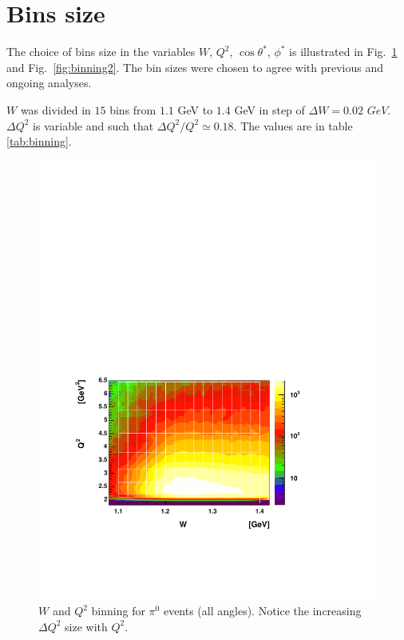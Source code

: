 \section{Bins size}
\label{sec:binning}
The choice of bins size in the variables $W$, $Q^2$, $\cos\theta^*$, $\phi^*$
is illustrated in Fig.~\ref{fig:binning1} and Fig.~\ref{fig:binning2}.
The bin sizes were chosen to agree with previous and ongoing analyses.


$W$ was divided in $15$ bins from $1.1$ GeV to $1.4$ GeV in step of
$\Delta W = 0.02$ $GeV$. $\Delta Q^2$ is variable and such that $\Delta Q^2/Q^2\simeq 0.18$. 
The values are in table \ref{tab:binning}.

\begin{figure}[h]
 \begin{center}
  \includegraphics[width=12cm, bb=40 140 520 460]{analysis/img/binning1}
  \caption[$W$ and $Q^2$ binning for $\pi^0$ events]
          { $W$ and $Q^2$ binning for $\pi^0$ events (all angles). Notice the increasing $\Delta Q^2$ size with $Q^2$.}
 \label{fig:binning1}
  \end{center} 
\end{figure} 


